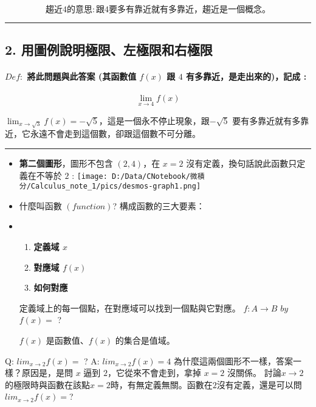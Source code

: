 \documentclass[]{article}
\let\oldparagraph\paragraph
\renewcommand{\paragraph}[1]{\oldparagraph{#1}\mbox{}}
\begin{document}
\[趨近 4 的意思: 跟 4 要多有靠近就有多靠近，趨近是一個概念。\]

\begin{center}\rule{0.5\linewidth}{\linethickness}\end{center}

\subsection{2. 用圖例說明極限、左極限和右極限}\label{header-n40}

\paragraph{\texorpdfstring{\(Def:\) 將此問題與此答案 (其函數值 \(f(x)\)
跟 \(4\) 有多靠近，是走出來的)，記成
:}{Def: 將此問題與此答案 (其函數值 f(x) 跟 4 有多靠近，是走出來的)，記成 :}}\label{header-n41}

\[\lim _{x\rightarrow 4}f\left( x\right)\]

\(\lim _{x\rightarrow \sqrt {3}}f\left( x\right) =-\sqrt {5}\)，這是一個永不停止現象，跟\(-\sqrt {5}\)
要有多靠近就有多靠近，它永遠不會走到這個數，卻跟這個數不可分離。

\begin{center}\rule{0.5\linewidth}{\linethickness}\end{center}

\begin{itemize}
\item
  \textbf{第二個圖形}，圖形不包含 \((2,4)\)，在 \(x=2\)
  沒有定義，換句話說此函數只定義在不等於 \(2\) :
  \texttt{[image: D:/Data/CNotebook/微積分/Calculus\_note\_1/pics/desmos-graph1.png]}
\item
  什麼叫函數 \((function)\)? 構成函數的三大要素：
\item
  \begin{enumerate}
  \def\labelenumi{\arabic{enumi}.}
  \item
    \textbf{定義域 \(x\)}
  \item
    \textbf{對應域 \(f(x)\)}
  \item
    \textbf{如何對應}
  \end{enumerate}

  定義域上的每一個點，在對應域可以找到一個點與它對應。 \(f:A→B \)
  \( by\) \(  f(x)=\) ?

  \( f(x)\) 是函數值、\(f(x)\) 的集合是值域。 
\end{itemize}

Q: \(lim _{x\rightarrow  {2}}f(x)= \) ? A:
\(lim _{x\rightarrow  {2}}f(x)= 4\)
為什麼這兩個圖形不一樣，答案一樣？原因是，是問 \(x\) 逼到
\(2\)，它從來不會走到，拿掉 \(x=2\) 沒關係。
討論\(x→2\)的極限時與函數在該點\(x=2\)時，有無定義無關。函數在\(2\)沒有定義，還是可以問
\(lim _{x\rightarrow  {2}}f(x)=\)?
\end{document}
